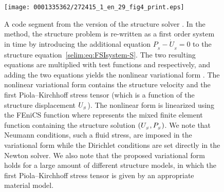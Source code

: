 \begin{figure}[!t]
\texttt{[image: 0001335362/272415\_1\_en\_29\_fig4\_print.eps]}
\caption{A code segment from the \cgone{} version of the structure
  solver . In the \cgone{} method, the structure problem
  is re-written as a first order system in time by introducing the
  additional equation $P_{_{S}} - \dot{U}_{_{S}} = 0$ to the structure
  equation~\eqref{selim:eq:FSIsystem-S}. The two resulting
  equations are multiplied with test functions  and 
  respectively, and adding the two equations yields the nonlinear
  variational form . The nonlinear variational form 
  contains the structure velocity  and the first
  Piola--Kirchhoff stress tensor  (which is a function of
  the structure displacement $U_{_{S}}$).  The nonlinear form  is
  linearized using the FEniCS function  where 
  represents the mixed finite element function containing the structure
  solution $(U_{_{S}}, P_{_{S}})$.  We note that Neumann conditions, such a
  fluid stress, are imposed in the variational form  while the
  Dirichlet conditions are set directly in the Newton solver. We also
  note that the proposed variational form holds for a large amount of
  different structure models, in which the first Piola--Kirchhoff stress
  tensor  is given by an appropriate material model.}
\label{selim:fig:structuresolver}
\end{figure}

